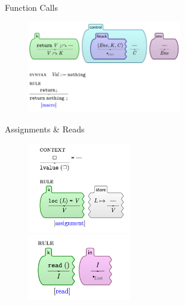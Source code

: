 \documentclass{beamer}
\begin{document}
\begin{frame}{Function Calls}
    \begin{figure}[H]
        \centering
    \includegraphics[width=0.6\textwidth]{fcall-2}
    \end{figure}
\end{frame}
\begin{frame}{Assignments \& Reads}
    \begin{figure}[H]
        \centering
    \includegraphics[width=0.4\textwidth]{assignment} \\
    \includegraphics[width=0.4\textwidth]{read}
    \end{figure}
\end{frame}
\end{document}
